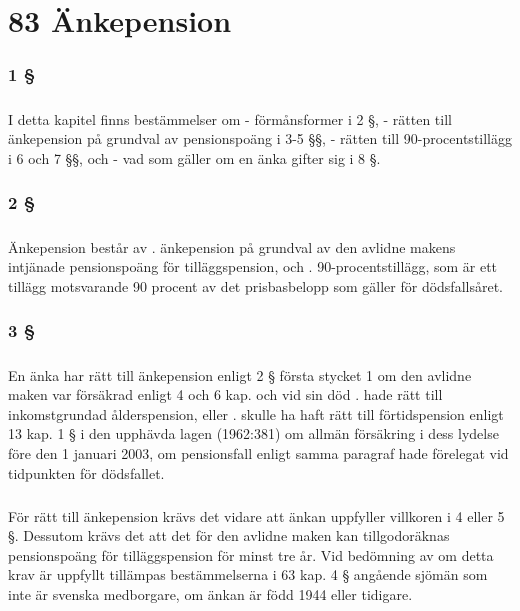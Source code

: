 \documentclass[a4paper,notitlepage,openany,10pt]{book}
\begin{document}
\chapter*{83 Änkepension}
\subsection*{1 §}
\paragraph*{}
I detta kapitel finns bestämmelser om
\newline - förmånsformer i 2 §,
\newline - rätten till änkepension på grundval av pensionspoäng i 3-5 §§,
\newline - rätten till 90-procentstillägg i 6 och 7 §§, och
\newline - vad som gäller om en änka gifter sig i 8 §.
\subsection*{2 §}
\paragraph*{}
Änkepension består av
. änkepension på grundval av den avlidne makens intjänade pensionspoäng för tilläggspension, och
. 90-procentstillägg, som är ett tillägg motsvarande 90 procent av det prisbasbelopp som gäller för dödsfallsåret.
\subsection*{3 §}
\paragraph*{}
En änka har rätt till änkepension enligt 2 § första stycket 1 om den avlidne maken var försäkrad enligt 4 och 6 kap. och vid sin död
. hade rätt till inkomstgrundad ålderspension, eller
. skulle ha haft rätt till förtidspension enligt 13 kap. 1 § i den upphävda lagen (1962:381) om allmän försäkring i dess lydelse före den 1 januari 2003, om pensionsfall enligt samma paragraf hade förelegat vid tidpunkten för dödsfallet.
\paragraph*{}
För rätt till änkepension krävs det vidare att änkan uppfyller villkoren i 4 eller 5 §. Dessutom krävs det att det för den avlidne maken kan tillgodoräknas pensionspoäng för tilläggspension för minst tre år. Vid bedömning av om detta krav är uppfyllt tillämpas bestämmelserna i 63 kap. 4 § angående sjömän som inte är svenska medborgare, om änkan är född 1944 eller tidigare.
\end{document}
